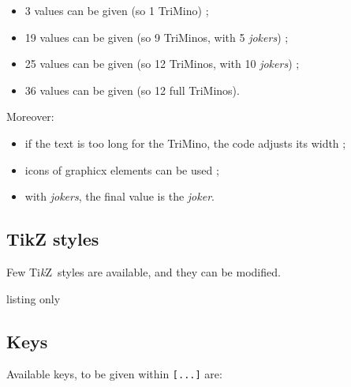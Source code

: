 \documentclass[11pt,a4paper]{ltxdoc}
\providecommand\tikzlogo{Ti\textit{k}Z}
\let\TikZ\tikzlogo
\begin{document}
\begin{itemize}
	\item 3 values can be given (so 1 \textsf{TriMino}) ;
	\item 19 values can be given (so 9 \textsf{TriMinos}, with 5 \textit{jokers}) ;
	\item 25 values can be given (so 12 \textsf{TriMinos}, with 10 \textit{jokers}) ;
	\item 36 values can be given (so 12 full \textsf{TriMinos}).
\end{itemize}

Moreover:

\begin{itemize}
	\item if the text is too long for the \textsf{TriMino}, the code adjusts its width ;
	\item icons of graphicx elements can be used ;
	\item with \textit{jokers}, the final value is the \textit{joker}.
\end{itemize}

\begin{DemoCode}{}
\end{DemoCode}

\pagebreak

\subsection{TikZ styles}

Few \TikZ\ styles are available, and they can be modified.

\begin{DemoCode}{listing only}


\end{DemoCode}

\subsection{Keys}

Available keys, to be given within \lstinline[language={[latex]TeX},basicstyle=\ttfamily]|[...]| are:
\end{document}

